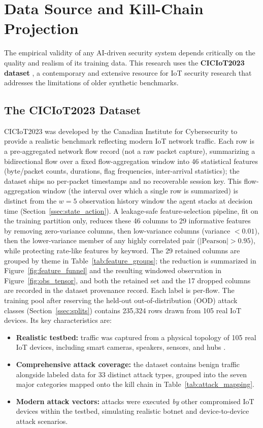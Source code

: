 \section{Data Source and Kill-Chain Projection}\label{sec:data_source}
The empirical validity of any AI-driven security system depends critically on the quality and realism of its training data. This research uses the \textbf{CICIoT2023 dataset} \cite{Neto2023}, a contemporary and extensive resource for IoT security research that addresses the limitations of older synthetic benchmarks.

\subsection{The CICIoT2023 Dataset}\label{ssec:dataset_desc}
CICIoT2023 was developed by the Canadian Institute for Cybersecurity to provide a realistic benchmark reflecting modern IoT network traffic. Each row is a pre-aggregated network flow record (not a raw packet capture), summarizing a bidirectional flow over a fixed flow-aggregation window into 46 statistical features (byte/packet counts, durations, flag frequencies, inter-arrival statistics); the dataset ships no per-packet timestamps and no recoverable session key. This flow-aggregation window (the interval over which a single row is summarized) is distinct from the $w = 5$ observation history window the agent stacks at decision time (Section~\ref{ssec:state_action}). A leakage-safe feature-selection pipeline, fit on the training partition only, reduces these 46 columns to 29 informative features by removing zero-variance columns, then low-variance columns (variance $<0.01$), then the lower-variance member of any highly correlated pair ($|\text{Pearson}| > 0.95$), while protecting rate-like features by keyword. The 29 retained columns are grouped by theme in Table~\ref{tab:feature_groups}; the reduction is summarized in Figure~\ref{fig:feature_funnel} and the resulting windowed observation in Figure~\ref{fig:obs_tensor}, and both the retained set and the 17 dropped columns are recorded in the dataset provenance record. Each label is per-flow. The training pool after reserving the held-out out-of-distribution (OOD) attack classes (Section~\ref{ssec:splits}) contains 235{,}324 rows drawn from 105 real IoT devices. Its key characteristics are:
\begin{itemize}
    \item \textbf{Realistic testbed:} traffic was captured from a physical topology of 105 real IoT devices, including smart cameras, speakers, sensors, and hubs \cite{Neto2023}.
    \item \textbf{Comprehensive attack coverage:} the dataset contains benign traffic alongside labeled data for 33 distinct attack types, grouped into the seven major categories mapped onto the kill chain in Table~\ref{tab:attack_mapping}.
    \item \textbf{Modern attack vectors:} attacks were executed \emph{by} other compromised IoT devices within the testbed, simulating realistic botnet and device-to-device attack scenarios.
\end{itemize}


